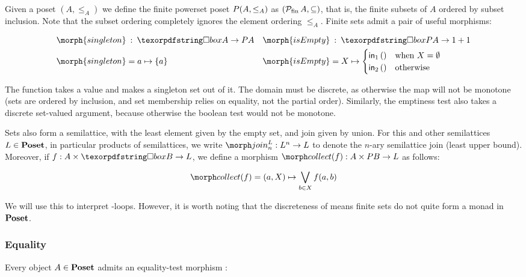 Given a poset $(A, \le_A)$ we define the finite powerset poset $P (A,
\le_A)$ as $(\mathcal{P}_{\mathrm{fin}}\, A, \subseteq)$, that is, the finite
subsets of $A$ ordered by subset inclusion.
%
Note that the subset ordering completely ignores the element ordering $\le_A$.
%
Finite sets admit a pair of useful morphisms:

\begin{align*}
  \morph{singleton} &\isa \iso A \to \pfinof A
  &
  \morph{isEmpty} &\isa \iso \pfinof A \to \terminalobject + \terminalobject
  \\
  \morph{singleton} &= a \mapsto \{a\}
  &
  \morph{isEmpty} &= X \mapsto 
  \begin{cases}
    \inj 1 () &\text{when }X = \emptyset\\
    \inj 2 () &\text{otherwise}
  \end{cases}
\end{align*}

\noindent
The  function takes a value and makes a singleton set out of
it. The domain must be discrete, as otherwise the map will not be monotone (sets
are ordered by inclusion, and set membership relies on equality, not the partial
order). Similarly, the emptiness test  also takes a discrete
set-valued argument, because otherwise the boolean test would not be monotone.

Sets also form a semilattice, with the least element given by the empty set, and
join given by union.
%
For this and other semilattices $L \in \textrm{\bfseries Poset}$, in particular products of
semilattices, we write $\morphjoin{L}{n} : L^n \to L$ to denote the $n$-ary
semilattice join (least upper bound).
%
Moreover, if $f : A \times \iso B \to L$, we define a morphism
$\pcollect{f} : A \times \pfinof{B} \to L$ as follows:

\begin{displaymath}
 \pcollect{f}  = (a, X) \mapsto \bigvee_{b \in X} f(a, b)
\end{displaymath}

\noindent
We will use this to interpret -loops. However, it is worth noting that
the discreteness of  means finite sets do not quite form a
monad in $\textrm{\bfseries Poset}$.


\subsubsection{Equality} Every object $A \in \textrm{\bfseries Poset}$ admits an equality-test morphism :

